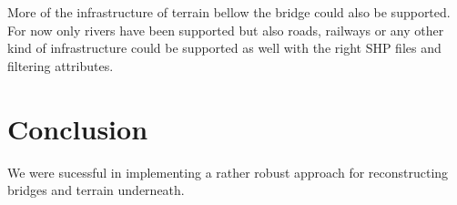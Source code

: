\documentclass{egpubl-eurovis-star}
\begin{document}
More of the infrastructure of terrain bellow the bridge could also be supported.
For now only rivers have been supported but also roads, railways or any other kind of infrastructure could be supported as well with the right SHP files and filtering attributes.

\section{Conclusion}

We were sucessful in implementing a rather robust approach for reconstructing bridges and terrain underneath.



%



\end{document}

